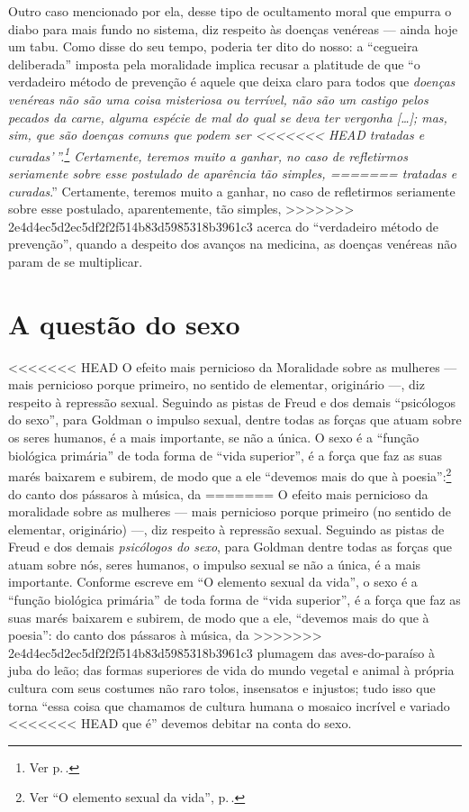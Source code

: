 Outro caso mencionado por ela, desse
tipo de ocultamento moral que empurra o diabo para mais fundo no
sistema, diz respeito às doenças venéreas --- ainda hoje um tabu. Como
disse do seu tempo, poderia ter dito do nosso: a ``cegueira deliberada''
imposta pela moralidade implica recusar a platitude de que ``o
verdadeiro método de prevenção é aquele que deixa claro para todos que
\textit{doenças venéreas não são uma coisa misteriosa ou terrível, não são um
castigo pelos pecados da carne, alguma espécie de mal do qual se deva
ter vergonha {[}\ldots{]}; mas, sim, que são doenças comuns que podem ser
<<<<<<< HEAD
tratadas e curadas'\,''.\footnote{Ver p.\,\pageref{std}.} Certamente, teremos muito a ganhar, no caso de refletirmos seriamente sobre esse postulado de aparência tão simples,
=======
tratadas e curadas}.'' Certamente, teremos muito a ganhar, no caso de
refletirmos seriamente sobre esse postulado, aparentemente, tão simples,
>>>>>>> 2e4d4ec5d2ec5df2f2f514b83d5985318b3961c3
acerca do ``verdadeiro método de prevenção'', quando a despeito dos
avanços na medicina, as doenças venéreas não param de se multiplicar.

\section{A questão do sexo}

<<<<<<< HEAD
O efeito mais pernicioso da Moralidade sobre as mulheres --- mais
pernicioso porque primeiro, no sentido de elementar, originário ---, diz
respeito à repressão sexual. Seguindo as pistas de Freud e dos demais
``psicólogos do sexo'', para Goldman o impulso sexual, dentre todas as forças que atuam
sobre os seres humanos, é a mais importante, se não a única.
O sexo é a ``função biológica primária'' de toda forma de ``vida superior'', é a
força que faz as suas marés baixarem e subirem, de modo que a ele
``devemos mais do que à poesia'':\footnote{Ver ``O elemento sexual da vida'', p.\,\pageref{sexual}.} do canto dos pássaros à música, da
=======
O efeito mais pernicioso da moralidade sobre as mulheres --- mais
pernicioso porque primeiro (no sentido de elementar, originário) ---, diz
respeito à repressão sexual. Seguindo as pistas de Freud e dos demais
\textit{psicólogos do sexo}, para Goldman dentre todas as forças que atuam
sobre nós, seres humanos, o impulso sexual se não a única, é a mais
importante. Conforme escreve em ``O elemento sexual da vida'', o sexo é
a ``função biológica primária'' de toda forma de ``vida superior'', é a
força que faz as suas marés baixarem e subirem, de modo que a ele,
``devemos mais do que à poesia'': do canto dos pássaros à música, da
>>>>>>> 2e4d4ec5d2ec5df2f2f514b83d5985318b3961c3
plumagem das aves-do-paraíso à juba do leão; das formas superiores de
vida do mundo vegetal e animal à própria cultura com seus costumes não
raro tolos, insensatos e injustos; tudo isso que torna
``essa coisa que chamamos de cultura humana o mosaico incrível e variado
<<<<<<< HEAD
que é'' devemos debitar na conta do sexo.

